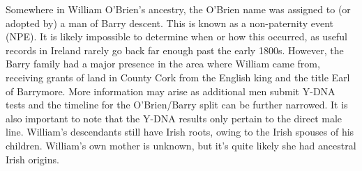 Somewhere in William O'Brien's ancestry, the O'Brien name was assigned to (or adopted by) a man of Barry descent. This is known as a non-paternity event (NPE). It is likely impossible to determine when or how this occurred, as useful records in Ireland rarely go back far enough past the early 1800s. However, the Barry family had a major presence in the area where William came from, receiving grants of land in County Cork from the English king and the title Earl of Barrymore.\cite{BarrymoreDNA:4} More information may arise as additional men submit Y-DNA tests and the timeline for the O'Brien/Barry split can be further narrowed. It is also important to note that the Y-DNA results only pertain to the direct male line. William's descendants still have Irish roots, owing to the Irish spouses of his children. William's own mother is unknown, but it's quite likely she had ancestral Irish origins.

